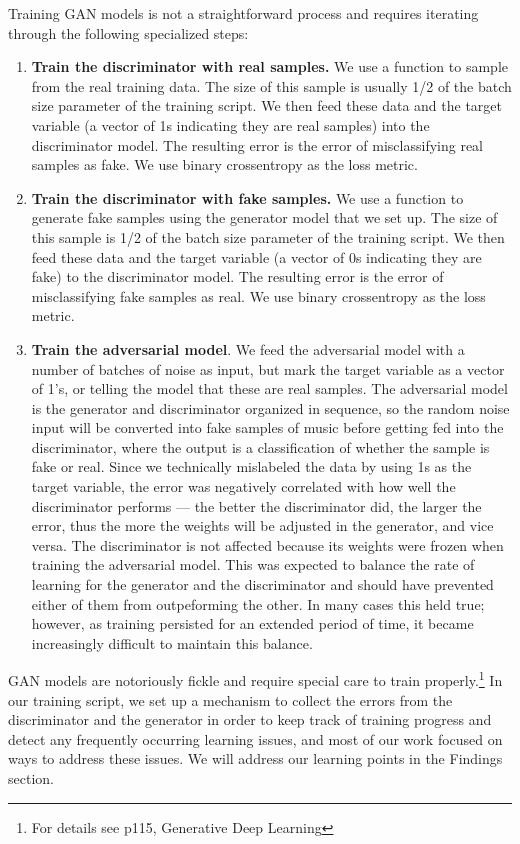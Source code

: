\documentclass[12pt,oneside]{chicagocapstone}
\providecommand{\tightlist}{%
  \setlength{\itemsep}{0pt}\setlength{\parskip}{0pt}}
\begin{document}
Training GAN models is not a straightforward process and requires iterating through the following specialized steps:
\begin{enumerate}
\def\labelenumi{\arabic{enumi}.}
\tightlist
\item
  \textbf{Train the discriminator with real samples.} We use a function to sample from the real training data. The size of this sample is usually 1/2 of the batch size parameter of the training script. We then feed these data and the target variable (a vector of 1s indicating they are real samples) into the discriminator model. The resulting error is the error of misclassifying real samples as fake. We use binary crossentropy as the loss metric.
\item
  \textbf{Train the discriminator with fake samples.} We use a function to generate fake samples using the generator model that we set up. The size of this sample is 1/2 of the batch size parameter of the training script. We then feed these data and the target variable (a vector of 0s indicating they are fake) to the discriminator model. The resulting error is the error of misclassifying fake samples as real. We use binary crossentropy as the loss metric.
\item
  \textbf{Train the adversarial model}. We feed the adversarial model with a number of batches of noise as input, but mark the target variable as a vector of 1's, or telling the model that these are real samples. The adversarial model is the generator and discriminator organized in sequence, so the random noise input will be converted into fake samples of music before getting fed into the discriminator, where the output is a classification of whether the sample is fake or real. Since we technically mislabeled the data by using 1s as the target variable, the error was negatively correlated with how well the discriminator performs --- the better the discriminator did, the larger the error, thus the more the weights will be adjusted in the generator, and vice versa. The discriminator is not affected because its weights were frozen when training the adversarial model. This was expected to balance the rate of learning for the generator and the discriminator and should have prevented either of them from outpeforming the other. In many cases this held true; however, as training persisted for an extended period of time, it became increasingly difficult to maintain this balance.
\end{enumerate}
GAN models are notoriously fickle and require special care to train properly.\footnote{For details see p115, Generative Deep Learning} In our training script, we set up a mechanism to collect the errors from the discriminator and the generator in order to keep track of training progress and detect any frequently occurring learning issues, and most of our work focused on ways to address these issues. We will address our learning points in the Findings section.
\end{document}
